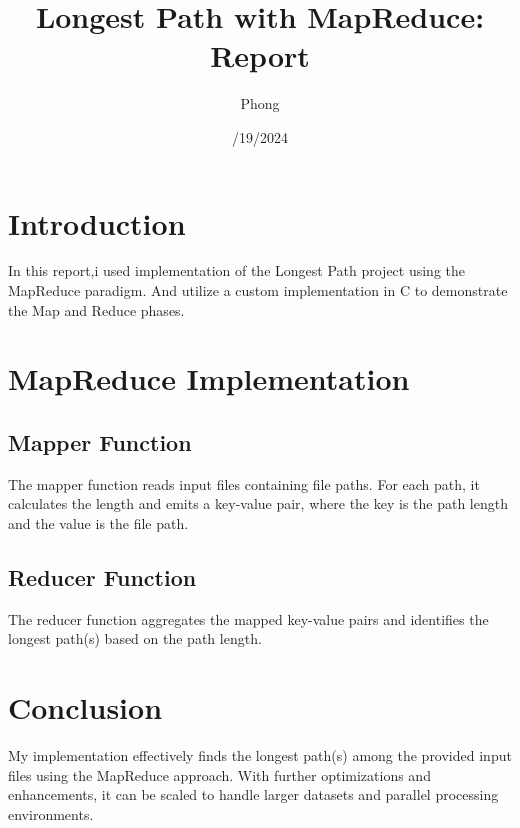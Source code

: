 \documentclass{article}
\begin{document}
\title{Longest Path with MapReduce: Report}
\author{Phong}
\date{/19/2024}
\maketitle

\section{Introduction}
In this report,i used implementation of the Longest Path project using the MapReduce paradigm. And utilize a custom implementation in C to demonstrate the Map and Reduce phases.

\section{MapReduce Implementation}

\subsection{Mapper Function}
The mapper function reads input files containing file paths. For each path, it calculates the length and emits a key-value pair, where the key is the path length and the value is the file path.

\subsection{Reducer Function}
The reducer function aggregates the mapped key-value pairs and identifies the longest path(s) based on the path length.

\section{Conclusion}
My implementation effectively finds the longest path(s) among the provided input files using the MapReduce approach. With further optimizations and enhancements, it can be scaled to handle larger datasets and parallel processing environments.
\end{document}
